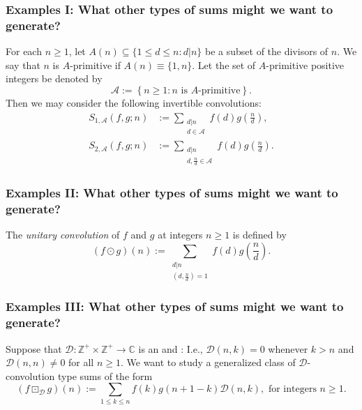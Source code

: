 \begin{frame}
\frametitle{Examples I: What other types of sums might we want to generate?}

\scriptsize
\begin{example}
For each $n \geq 1$, let $A(n) \subseteq \{1 \leq d \leq n: d|n\}$ be a subset of 
the divisors of $n$. 
We say that $n$ is $A$-primitive if $A(n) \equiv \{1,n\}$. 
Let the set of $A$-primitive positive integers be denoted by 
\[
\mathcal{A} := \left\{n \geq 1: n \text{ is $A$-primitive}\right\}. 
\]
Then we may consider the following invertible convolutions: 
\begin{align*}
S_{1,\mathcal{A}}(f, g; n) & := \sum_{\substack{d|n \\ d \in \mathcal{A}}} f(d) g\left(\frac{n}{d}\right), \\ 
S_{2,\mathcal{A}}(f, g; n) & := \sum_{\substack{d|n \\ d,\frac{n}{d} \in \mathcal{A}}} f(d) g\left(\frac{n}{d}\right). 
\end{align*}
\end{example}

\end{frame}

\begin{frame}
\frametitle{Examples II: What other types of sums might we want to generate?}

\begin{example}
The \emph{unitary convolution} of $f$ and $g$ at integers $n \geq 1$ is defined by 
\[
(f \odot g)(n) := \sum_{\substack{d|n \\ \left(d, \frac{n}{d}\right)=1}} f(d) g\left(\frac{n}{d}\right). 
\]
\end{example}

\end{frame}

\begin{frame}
\frametitle{Examples III: What other types of sums might we want to generate?}

\begin{example}
Suppose that $\mathcal{D}: \mathbb{Z}^{+} \times \mathbb{Z}^{+} \rightarrow \mathbb{C}$ is an 
 and : I.e., 
$\mathcal{D}(n, k) = 0$ whenever $k > n$ and $\mathcal{D}(n, n) \neq 0$ for all $n \geq 1$. 
We want to study a generalized class of $\mathcal{D}$-convolution type sums 
of the form 
\[
\left(f \boxdot_{\mathcal{D}} g\right)(n) := \sum_{1 \leq k \leq n} f(k) g(n+1-k) \mathcal{D}(n, k), 
	\text{ for integers } n \geq 1. 
\]
\end{example}

\end{frame}

